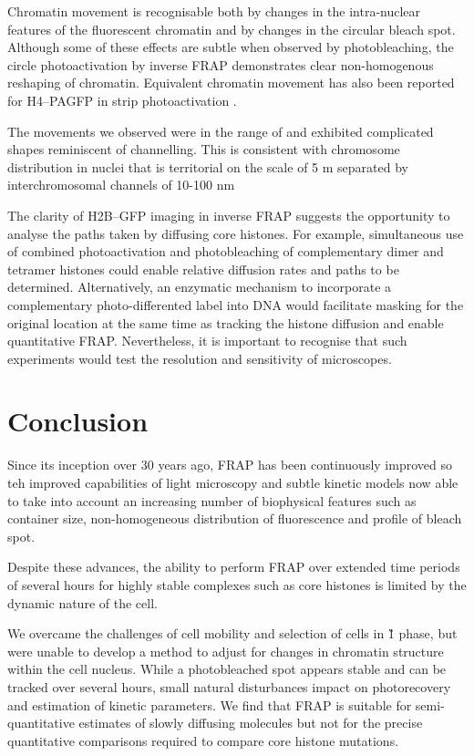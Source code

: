     Chromatin movement is recognisable both
    by changes in the intra-nuclear features of the fluorescent chromatin
    and by changes in the circular bleach spot.
    Although some of these effects are subtle when observed by photobleaching,
    the circle photoactivation by inverse FRAP demonstrates
    clear non-homogenous reshaping of chromatin.
    Equivalent chromatin movement has also been reported
    for H4--PAGFP in strip photoactivation \cite{H4PAGFP-chromatin-movement}.

    The movements we observed were in the
    range of 
    and exhibited complicated shapes reminiscent of channelling.
    This is consistent with chromosome distribution in nuclei that is
    territorial on the scale of 5 \textmu m 
    separated by interchromosomal channels of 10-100 nm 

    The clarity of H2B--GFP imaging in inverse FRAP
    suggests the opportunity to analyse the
    paths taken by diffusing core histones.
    For example, simultaneous use of combined
    photoactivation and photobleaching
    of complementary dimer and tetramer histones could
    enable relative diffusion rates and paths to be determined.
    Alternatively, an enzymatic mechanism to incorporate a
    complementary photo-differented label
    into DNA  would facilitate masking for
    the original location at the same time as tracking the histone diffusion
    and enable quantitative FRAP.
    Nevertheless, it is important to recognise
    that such experiments would test the
    resolution and sensitivity of microscopes.

\section{Conclusion}

    Since its inception over 30 years ago, FRAP has been continuously improved
    so teh improved capabilities of light microscopy
    and subtle kinetic models now able to take into account
    an increasing number of biophysical features such as container size,
    non-homogeneous distribution of fluorescence and profile of bleach spot.

    Despite these advances, the ability to perform FRAP
    over extended time periods of several hours for highly stable complexes
    such as core histones is limited by the dynamic nature of the cell.

    We overcame the challenges of cell mobility
    and selection of cells in \G1{} phase,
    but were unable to develop a method to adjust
    for changes in chromatin structure within the cell nucleus.
    While a photobleached spot appears stable and
    can be tracked over several hours,
    small natural disturbances impact on photorecovery
    and estimation of kinetic parameters.
    We find that FRAP is suitable for semi-quantitative
    estimates of slowly diffusing molecules
    but not for the precise quantitative comparisons
    required to compare core histone mutations.

